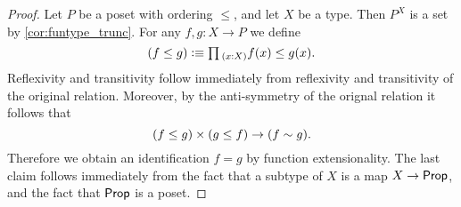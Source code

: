 \begin{proof}
  Let $P$ be a poset with ordering $\leq$, and let $X$ be a type. Then $P^X$ is a set by \cref{cor:funtype_trunc}. For any $f,g:X\to P$ we define
  \begin{equation*}
    (f\leq g) \defeq \prd{x:X}f(x)\leq g(x).
  \end{equation*}
  Reflexivity and transitivity follow immediately from reflexivity and transitivity of the original relation. Moreover, by the anti-symmetry of the orignal relation it follows that
  \begin{equation*}
    (f\leq g)\times (g\leq f) \to (f\sim g). 
  \end{equation*}
  Therefore we obtain an identification $f=g$ by function extensionality. The last claim follows immediately from the fact that a subtype of $X$ is a map $X\to\mathsf{Prop}$, and the fact that $\mathsf{Prop}$ is a poset.
\end{proof}

